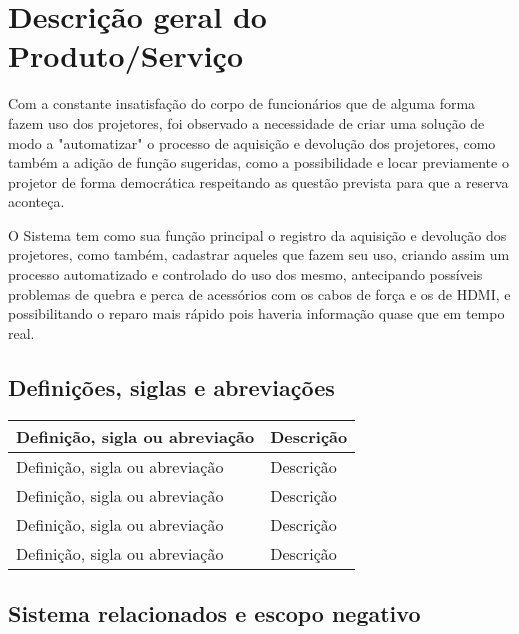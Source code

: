 \section{Descrição geral do Produto/Serviço}
\hspace{2.0cm}

Com a constante insatisfação do corpo de funcionários que de alguma forma fazem 
uso dos projetores, foi observado a necessidade de criar uma solução de modo 
a "automatizar" o processo de aquisição e devolução dos projetores, como também 
a adição de função sugeridas, como a possibilidade e locar previamente o projetor
de forma democrática respeitando as questão prevista para que a reserva aconteça. 

O Sistema tem como sua função principal o registro da aquisição e devolução dos 
projetores, como também, cadastrar aqueles que fazem seu uso, criando assim um 
processo automatizado e controlado do uso dos mesmo, antecipando possíveis 
problemas de quebra e perca de acessórios com os cabos de força e os de HDMI, 
e possibilitando o reparo mais rápido pois haveria informação quase que em tempo real. 

\hspace{2.0cm}

\subsection{Definições, siglas e abreviações}

\hspace{1.0cm}

  \begin{tabular}{| l | l |}\hline

    Definição, sigla ou abreviação & Descrição \\ \hline
    Definição, sigla ou abreviação & Descrição \\ \hline
    Definição, sigla ou abreviação & Descrição \\ \hline
    Definição, sigla ou abreviação & Descrição \\ \hline
    Definição, sigla ou abreviação & Descrição \\ \hline

  \end{tabular}


  
\subsection{Sistema relacionados e escopo negativo}

